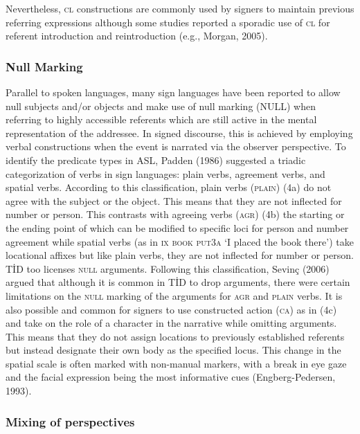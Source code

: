 \documentclass[
  english,
  doc,mask]{apa6}
\begin{document}
Nevertheless, \textsc{cl} constructions are commonly used by signers to maintain previous referring expressions although some studies reported a sporadic use of \textsc{cl} for referent introduction and reintroduction (e.g., Morgan, 2005).

\hypertarget{null-marking}{%
\subsubsection{Null Marking}\label{null-marking}}

Parallel to spoken languages, many sign languages have been reported to allow null subjects and/or objects and make use of null marking (\textsc{NULL}) when referring to highly accessible referents which are still active in the mental representation of the addressee. In signed discourse, this is achieved by employing verbal constructions when the event is narrated via the observer perspective. To identify the predicate types in ASL, Padden (1986) suggested a triadic categorization of verbs in sign languages: plain verbs, agreement verbs, and spatial verbs. According to this classification, plain verbs (\textsc{plain}) (4a) do not agree with the subject or the object. This means that they are not inflected for number or person. This contrasts with agreeing verbs (\textsc{agr}) (4b) the starting or the ending point of which can be modified to specific loci for person and number agreement while spatial verbs (as in \textsc{ix book put3a} `I placed the book there') take locational affixes but like plain verbs, they are not inflected for number or person. TİD too licenses \textsc{null} arguments. Following this classification, Sevinç (2006) argued that although it is common in TİD to drop arguments, there were certain limitations on the \textsc{null} marking of the arguments for \textsc{agr} and \textsc{plain} verbs. It is also possible and common for signers to use constructed action (\textsc{ca}) as in (4c) and take on the role of a character in the narrative while omitting arguments. This means that they do not assign locations to previously established referents but instead designate their own body as the specified locus. This change in the spatial scale is often marked with non-manual markers, with a break in eye gaze and the facial expression being the most informative cues (Engberg-Pedersen, 1993).

\hypertarget{mixing-of-perspectives}{%
\subsubsection{\texorpdfstring{\textbf{Mixing of perspectives}}{Mixing of perspectives}}\label{mixing-of-perspectives}}
\end{document}
